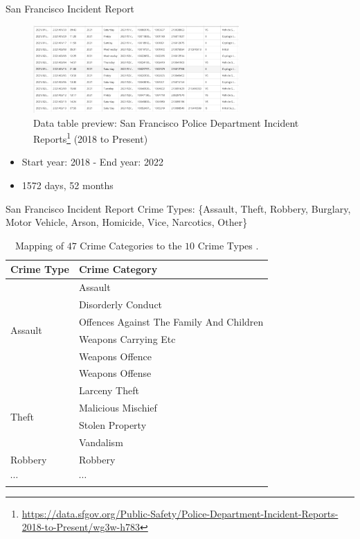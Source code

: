 \documentclass[10pt]{beamer}
\begin{document}
\begin{frame}{San Francisco Incident Report}
\begin{figure}
  \centering
  \caption{Data table preview: San Francisco Police Department Incident Reports\footnote{\url{https://data.sfgov.org/Public-Safety/Police-Department-Incident-Reports-2018-to-Present/wg3w-h783}} (2018 to Present)}
    \includegraphics[width=0.7\textwidth]{SF_dataset.png}
\end{figure}
{\small
\begin{itemize}
    \item Start year: 2018 - End year: 2022
    \item 1572 days, 52 months
    
\end{itemize}
}
\end{frame}

\begin{frame}{San Francisco Incident Report}
Crime Types: \{Assault, Theft, Robbery, Burglary, Motor Vehicle, Arson, Homicide, Vice, Narcotics, Other\}
\begin{table}[h!]
\centering
\caption{Mapping of $47$ Crime Categories to the $10$ Crime Types \citep{stalidis2021examining}.}
{\footnotesize
 \begin{tabular}{ll} 
 \toprule
 \textbf{Crime Type} & \textbf{Crime Category} \\ [0.5ex] 
 \midrule
 \multirow{6}{}{Assault} & Assault  \\ 
 &Disorderly Conduct\\
 &Offences Against The Family And Children\\
 &Weapons Carrying Etc\\
 &Weapons Offence\\
 &Weapons Offense\\
 \hline
 \multirow{4}{}{Theft} & Larceny Theft \\
 &Malicious Mischief\\
 &Stolen Property\\
 &Vandalism\\
 \hline
 Robbery & Robbery \\
 \hline
 $\cdots$ & $\cdots$\\
 \bottomrule
 \end{tabular}
 }
 \end{table}
 
\end{frame}
\end{document}
